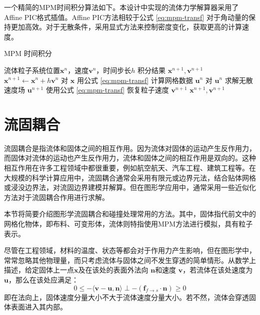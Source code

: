 一个精简的MPM时间积分算法如下。本设计中实现的流体力学解算器采用了Affine PIC格式插值。Affine PIC方法相较于公式 \ref{eq:mpm-transf} 对于角动量的保持更加高效。对于无散条件，采用显式方法来控制密度变化，获取更高的计算速度。
\begin{algorithm}[H]
  \caption{MPM 时间积分}
  \begin{algorithmic}[1]
    \label{algo:mpm-time-integration}
    \Require 流体粒子系统位置$\mathbf x^n$，速度$\mathbf v^n$，时间步长$h$
    \Ensure 积分结果 $\mathbf x^{n+1}, \mathbf v^{n+1}$
    \State $\mathbf x ^{n+1} \leftarrow \mathbf x^{n} + h \mathbf v^{n}$
    \State 对 $\mathbf x$ 用公式 \ref{eq:mpm-transf} 计算网格数据 $\mathbf u^{n}$
    \State 对 $\mathbf u^{n}$ 求解无散速度场 $\mathbf u^{n+1}$
    \State 使用公式 \ref{eq:mpm-transf} 恢复粒子速度 $\mathbf v^{n+1}$
    \State \Return $\mathbf x^{n+1}, \mathbf v^{n+1}$
  \end{algorithmic}
\end{algorithm}

\section{流固耦合}

流固耦合是指流体和固体之间的相互作用。因为流体对固体的运动产生反作用力，而固体对流体的运动也产生反作用力，流体和固体之间的相互作用是双向的。这种相互作用在许多工程领域中都很重要，例如航空航天、汽车工程、建筑工程等。在大规模的科学计算应用中，流固耦合通常会采用有限元或边界元法，结合贴体网格或浸没边界法，对流固边界建模并解算。但在图形学应用中，通常采用一些近似化方法对于流固耦合作用进行求解。

本节将简要介绍图形学流固耦合和碰撞处理常用的方法。其中，固体指代前文中的网格化物体，即布料、可变形体，流体则特指使用MPM方法进行模拟，具有粒子表示。

尽管在工程领域，材料的温度、状态等都会对于作用力产生影响，但在图形学中，常常忽略其他物理量，而只考虑流体与固体之间不发生穿透的简单情形。从数学上描述，给定固体上一点$\mathbf x$及在该处的表面外法向 $\mathbf n$和速度 $\mathbf v$，若流体在该处速度为$\mathbf u$，那么在该处应满足：
\begin{equation}\label{eq:coupling-velocity}
  0 \le -\langle \mathbf v - \mathbf u, \mathbf n \rangle \perp -(\mathbf f_{f\rightarrow s} \cdot \mathbf n) \ge 0
\end{equation}
即在法向上，固体速度分量大小不大于流体速度分量大小。若不然，流体会穿透固体表面进入其内部。

